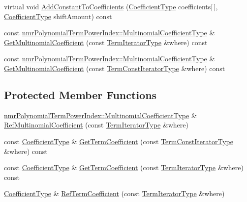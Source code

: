 \begin{DoxyCompactItemize}
\item 
virtual void \hyperlink{classnmr_bernstein_polynomial_a02c6714afc14c2138054e6b27ab8375b}{Add\+Constant\+To\+Coefficients} (\hyperlink{classnmr_polynomial_base_a8693efdfc8585ccb49abea69f74f3eef}{Coefficient\+Type} coefficients\mbox{[}$\,$\mbox{]}, \hyperlink{classnmr_polynomial_base_a8693efdfc8585ccb49abea69f74f3eef}{Coefficient\+Type} shift\+Amount) const 
\item 
const \hyperlink{classnmr_polynomial_term_power_index_a09f482da776cfb829e26ad1fb381ab94}{nmr\+Polynomial\+Term\+Power\+Index\+::\+Multinomial\+Coefficient\+Type} \& \hyperlink{classnmr_bernstein_polynomial_a934b948b27ef035ef62aa43c635ae784}{Get\+Multinomial\+Coefficient} (const \hyperlink{classnmr_polynomial_container_a276e57445d038e8a16462f47b85719a3}{Term\+Iterator\+Type} \&where) const 
\item 
const \hyperlink{classnmr_polynomial_term_power_index_a09f482da776cfb829e26ad1fb381ab94}{nmr\+Polynomial\+Term\+Power\+Index\+::\+Multinomial\+Coefficient\+Type} \& \hyperlink{classnmr_bernstein_polynomial_a30b33638e9343cec80cea704f364dde2}{Get\+Multinomial\+Coefficient} (const \hyperlink{classnmr_polynomial_container_aba8d31506ab6a487fdc4fe2815469442}{Term\+Const\+Iterator\+Type} \&where) const 
\end{DoxyCompactItemize}
\subsection*{Protected Member Functions}
\begin{DoxyCompactItemize}
\item 
\hyperlink{classnmr_polynomial_term_power_index_a09f482da776cfb829e26ad1fb381ab94}{nmr\+Polynomial\+Term\+Power\+Index\+::\+Multinomial\+Coefficient\+Type} \& \hyperlink{classnmr_bernstein_polynomial_ab72225000d4462b8ce1c941a29245268}{Ref\+Multinomial\+Coefficient} (const \hyperlink{classnmr_polynomial_container_a276e57445d038e8a16462f47b85719a3}{Term\+Iterator\+Type} \&where)
\item 
const \hyperlink{classnmr_polynomial_base_a8693efdfc8585ccb49abea69f74f3eef}{Coefficient\+Type} \& \hyperlink{classnmr_bernstein_polynomial_ad19aadc8aee129cc1201f638f9340c28}{Get\+Term\+Coefficient} (const \hyperlink{classnmr_polynomial_container_aba8d31506ab6a487fdc4fe2815469442}{Term\+Const\+Iterator\+Type} \&where) const 
\item 
const \hyperlink{classnmr_polynomial_base_a8693efdfc8585ccb49abea69f74f3eef}{Coefficient\+Type} \& \hyperlink{classnmr_bernstein_polynomial_a15e4932f2013e9157706fce26d34d5d0}{Get\+Term\+Coefficient} (const \hyperlink{classnmr_polynomial_container_a276e57445d038e8a16462f47b85719a3}{Term\+Iterator\+Type} \&where) const 
\item 
\hyperlink{classnmr_polynomial_base_a8693efdfc8585ccb49abea69f74f3eef}{Coefficient\+Type} \& \hyperlink{classnmr_bernstein_polynomial_a991fafd8dcb73e118ad9f7a046bc59a5}{Ref\+Term\+Coefficient} (const \hyperlink{classnmr_polynomial_container_a276e57445d038e8a16462f47b85719a3}{Term\+Iterator\+Type} \&where)
\end{DoxyCompactItemize}
